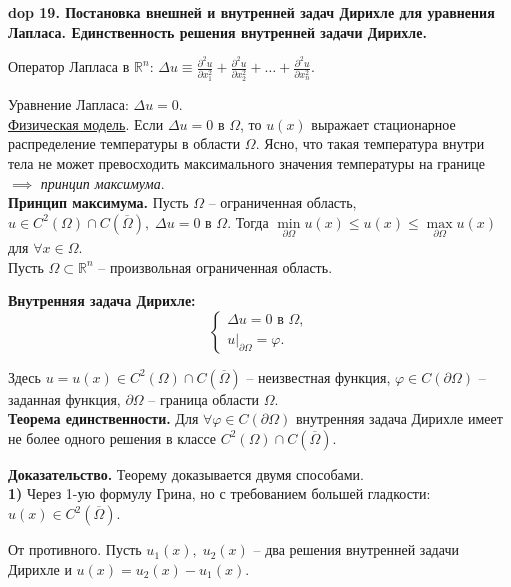 \textbf{\LARGE dop 19. Постановка внешней и внутренней задач Дирихле для уравнения Лапласа. Единственность решения внутренней задачи Дирихле.}

Оператор Лапласа в $\mathbb{R}^n$: $\Delta u \equiv \frac{\partial^2 u}{\partial x_1^2} + \frac{\partial^2 u}{\partial x_2^2} + \ldots + \frac{\partial^2 u}{\partial x_n^2}$.

Уравнение Лапласа: $\Delta u = 0$.\\

\underline{Физическая модель}. Если $\Delta u = 0$ в $\Omega$, то $u(x)$ выражает стационарное распределение
температуры в области $\Omega$. Ясно, что такая температура внутри тела не может превосходить максимального значения температуры на границе $\implies$ \textit{принцип максимума}.\\

\textbf{Принцип максимума.} Пусть $\Omega$ -- ограниченная область, $u \in C^2(\Omega) \cap C(\overline{\Omega}), \; \Delta u = 0$ в $\Omega$. Тогда $\min\limits_{\partial \Omega} u(x) \leq u(x) \leq \max\limits_{\partial \Omega} u(x)$ для $\forall x \in \Omega$. \\

Пусть $\Omega \subset \mathbb{R}^n$ -- произвольная ограниченная область.

\textbf{Внутренняя задача Дирихле:}
\begin{equation*}
    \begin{cases}
    \Delta u = 0 \text{ в } \Omega, \\
    u |_{\partial \Omega} = \varphi.
    \end{cases}
\end{equation*}

Здесь $u = u(x) \in C^2(\Omega) \cap C(\overline{\Omega})$ -- неизвестная функция, $\varphi \in C(\partial \Omega)$ -- заданная функция, $\partial \Omega$ -- граница области $\Omega$.
\\

\textbf{Теорема единственности.} Для 
$\forall \varphi \in C(\partial \Omega)$ внутренняя задача Дирихле имеет не более одного решения в классе $C^2(\Omega) \cap C(\overline{\Omega})$.

\textbf{Доказательство.} Теорему доказывается двумя способами.\\

\textbf{1)} Через 1-ую формулу Грина, но с требованием большей гладкости: $u(x) \in C^2(\overline{\Omega})$. 

От противного. Пусть $u_1(x), \; u_2(x)$ -- два решения внутренней задачи Дирихле и $u(x) = u_2(x) - u_1(x)$.

